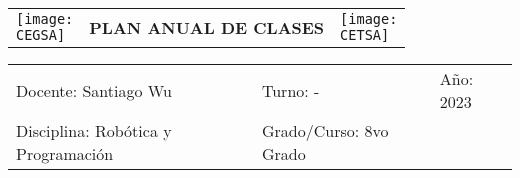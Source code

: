 \documentclass[landscape, a4paper, 10pt]{article}
\newcommand{\profesor}{Santiago Wu}
\newcommand{\discipline}{Robótica y Programación}
\newcommand{\currentyear}{2023}
\newcommand{\CEGSA}{cegsa-logo.png}
\newcommand{\CETSA}{cetsa-logo.png}
\begin{document}
	\pagebreak[4]
	\begin{tabularx}{\textwidth}{ >{\raggedright\arraybackslash}X >{\centering\arraybackslash}X >{\raggedleft\arraybackslash}X }
		\texttt{[image: \\CEGSA]} &
		\textbf{PLAN ANUAL DE CLASES} &
		\texttt{[image: \\CETSA]}
	\end{tabularx}
	\begin{tabularx}{\textwidth}{ >{\raggedright\arraybackslash}X >{\raggedright\arraybackslash}X >{\raggedright\arraybackslash}X }
		Docente: \profesor &
		Turno: - &
		Año: \currentyear \\
		Disciplina: \discipline &
		Grado/Curso: 8vo Grado &
		 \\
	\end{tabularx}
	\centering
\end{document}
